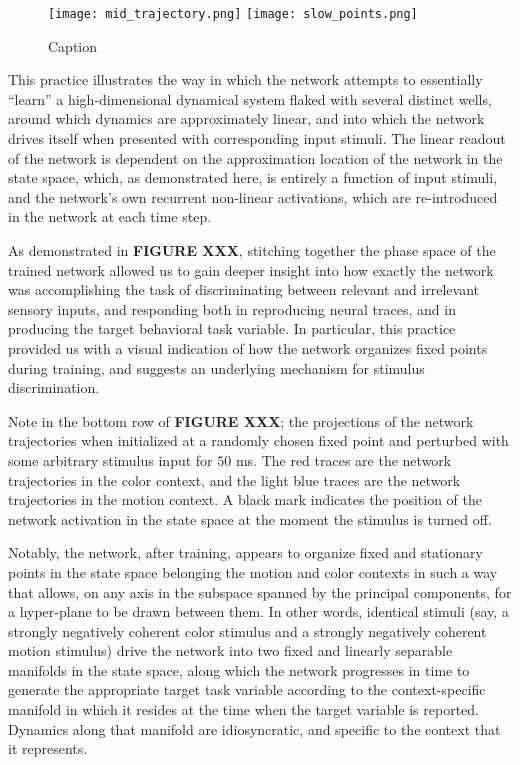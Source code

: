 \documentclass[12pt,a4paper,final]{iopart}
\begin{document}
\begin{figure}
    \centering
    \texttt{[image: mid\_trajectory.png]}
    \texttt{[image: slow\_points.png]}
    \caption{Caption}
    \label{fig:my_label}
\end{figure}

This practice illustrates the way in which the network attempts to essentially ``learn'' a high-dimensional dynamical system flaked with several distinct wells, around which dynamics are approximately linear, and into which the network drives itself when presented with corresponding input stimuli. The linear readout of the network is dependent on the approximation location of the network in the state space, which, as demonstrated here, is entirely a function of input stimuli, and the network's own recurrent non-linear activations, which are re-introduced in the network at each time step.

As demonstrated in \textbf{FIGURE XXX}, stitching together the phase space of the trained network allowed us to gain deeper insight into how exactly the network was accomplishing the task of discriminating between relevant and irrelevant sensory inputs, and responding both in reproducing neural traces, and in producing the target behavioral task variable. In particular, this practice provided us with a visual indication of how the network organizes fixed points during training, and suggests an underlying mechanism for stimulus discrimination.

Note in the bottom row of \textbf{FIGURE XXX}; the projections of the network trajectories when initialized at a randomly chosen fixed point and perturbed with some arbitrary stimulus input for $50$ ms. The red traces are the network trajectories in the color context, and the light blue traces are the network trajectories in the motion context. A black mark indicates the position of the network activation in the state space at the moment the stimulus is turned off. 

Notably, the network, after training, appears to organize fixed and stationary points in the state space belonging the motion and color contexts in such a way that allows, on any axis in the subspace spanned by the principal components, for a hyper-plane to be drawn between them. In other words, identical stimuli (say, a strongly negatively coherent color stimulus and a strongly negatively coherent motion stimulus) drive the network into two fixed and linearly separable manifolds in the state space, along which the network progresses in time to generate the appropriate target task variable according to the context-specific manifold in which it resides at the time when the target variable is reported. Dynamics along that manifold are idiosyncratic, and specific to the context that it represents.
\end{document}
